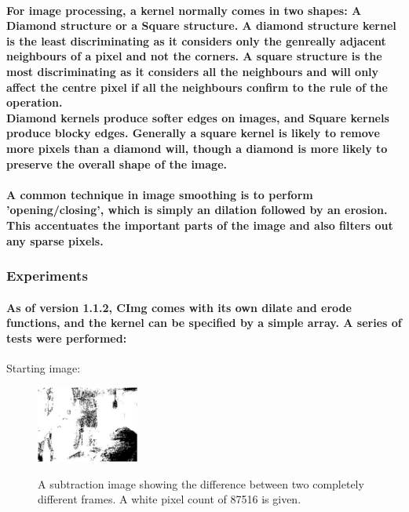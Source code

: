 \documentclass[11pt]{article} %
\begin{document}
\paragraph{For  image processing, a kernel normally comes in two shapes: A Diamond structure or a Square structure. A diamond structure kernel is the least discriminating as it considers only the genreally adjacent neighbours of a pixel and not the corners. A square structure  is the most discriminating as it considers all the neighbours and will only affect the centre pixel if all the neighbours confirm to the rule of the operation.
\\
Diamond kernels produce softer edges on images, and Square kernels produce blocky edges. Generally a square kernel is likely to remove more pixels than a diamond will, though a diamond is more likely to preserve the overall shape of the image.
}
\paragraph{A common technique in image smoothing is to perform 'opening/closing', which is simply an dilation followed by an erosion. This accentuates the important parts of the image and also filters out any sparse pixels.}

\subsubsection{Experiments}
\paragraph{As of version 1.1.2, CImg comes with its own dilate and erode functions, and the kernel can be specified by a simple array. A series of tests were performed:
}
Starting image:
\\
\begin{figure}
	\vspace{-20pt}
	\begin{center}
		\includegraphics[width=0.3\textwidth]{../images/ImageOps/uneditedsub}
		\label{img:uneditsub1}
	\end{center}
	\vspace{-20pt}
	\caption{A subtraction image showing the difference between two  completely different frames. A white pixel count of 87516 is given.}
\end{figure}
\end{document}
